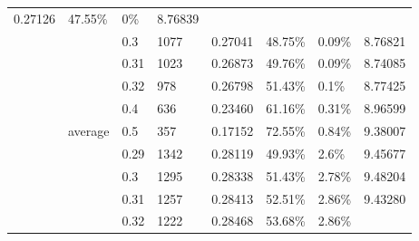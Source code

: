{\begin{longtable}[c]{|llllllll|}
  \multicolumn{1}{l|}{0.27126} &
  \multicolumn{1}{l|}{47.55\%} &
  \multicolumn{1}{l|}{0\%} &
  8.76839 \\ \cline{3-8} 
\multicolumn{1}{|l|}{} &
  \multicolumn{1}{l|}{} &
  \multicolumn{1}{l|}{0.3} &
  \multicolumn{1}{l|}{1077} &
  \multicolumn{1}{l|}{0.27041} &
  \multicolumn{1}{l|}{48.75\%} &
  \multicolumn{1}{l|}{0.09\%} &
  8.76821 \\ \cline{3-8} 
\multicolumn{1}{|l|}{} &
  \multicolumn{1}{l|}{} &
  \multicolumn{1}{l|}{0.31} &
  \multicolumn{1}{l|}{1023} &
  \multicolumn{1}{l|}{0.26873} &
  \multicolumn{1}{l|}{49.76\%} &
  \multicolumn{1}{l|}{0.09\%} &
  8.74085 \\ \cline{3-8} 
\multicolumn{1}{|l|}{} &
  \multicolumn{1}{l|}{} &
  \multicolumn{1}{l|}{0.32} &
  \multicolumn{1}{l|}{978} &
  \multicolumn{1}{l|}{0.26798} &
  \multicolumn{1}{l|}{51.43\%} &
  \multicolumn{1}{l|}{0.1\%} &
  8.77425 \\ \cline{3-8} 
\multicolumn{1}{|l|}{} &
  \multicolumn{1}{l|}{} &
  \multicolumn{1}{l|}{0.4} &
  \multicolumn{1}{l|}{636} &
  \multicolumn{1}{l|}{0.23460} &
  \multicolumn{1}{l|}{61.16\%} &
  \multicolumn{1}{l|}{0.31\%} &
  8.96599 \\ \cline{3-8} 
\multicolumn{1}{|l|}{} &
  \multicolumn{1}{l|}{\multirow{-12}{*}{average}} &
  \multicolumn{1}{l|}{0.5} &
  \multicolumn{1}{l|}{357} &
  \multicolumn{1}{l|}{0.17152} &
  \multicolumn{1}{l|}{72.55\%} &
  \multicolumn{1}{l|}{0.84\%} &
  9.38007 \\ \cline{2-8} 
\multicolumn{1}{|l|}{} &
  \multicolumn{1}{l|}{} &
  \multicolumn{1}{l|}{0.29} &
  \multicolumn{1}{l|}{1342} &
  \multicolumn{1}{l|}{0.28119} &
  \multicolumn{1}{l|}{{\color[HTML]{212121} 49.93\%}} &
  \multicolumn{1}{l|}{2.6\%} &
  9.45677 \\ \cline{3-8} 
\multicolumn{1}{|l|}{} &
  \multicolumn{1}{l|}{} &
  \multicolumn{1}{l|}{0.3} &
  \multicolumn{1}{l|}{1295} &
  \multicolumn{1}{l|}{0.28338} &
  \multicolumn{1}{l|}{51.43\%} &
  \multicolumn{1}{l|}{2.78\%} &
  9.48204 \\ \cline{3-8} 
\multicolumn{1}{|l|}{} &
  \multicolumn{1}{l|}{} &
  \multicolumn{1}{l|}{0.31} &
  \multicolumn{1}{l|}{1257} &
  \multicolumn{1}{l|}{0.28413} &
  \multicolumn{1}{l|}{52.51\%} &
  \multicolumn{1}{l|}{2.86\%} &
  9.43280 \\ \cline{3-8} 
\multicolumn{1}{|l|}{} &
  \multicolumn{1}{l|}{} &
  \multicolumn{1}{l|}{0.32} &
  \multicolumn{1}{l|}{1222} &
  \multicolumn{1}{l|}{0.28468} &
  \multicolumn{1}{l|}{53.68\%} &
  \multicolumn{1}{l|}{2.86\%} &

\end{longtable}}
